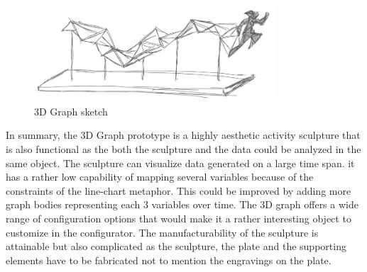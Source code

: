 \documentclass[../medieninformatik-arbeit.tex]{subfiles}
\begin{document}
\begin{figure}[h]
\captionsetup{width=0.8\textwidth}
\begin{center}
  \includegraphics[width=0.8\textwidth]{Prototype/img/3DGraph_detail}
  \caption{3D Graph sketch}
\label{fig:3DgraphDetail}
\end{center}
\end{figure}

In summary, the 3D Graph prototype is a highly aesthetic activity sculpture that is also functional as the both the sculpture and the data could be analyzed in the same object. The sculpture can visualize data generated on a large time span. it has a rather low capability of mapping several variables because of the constraints of the line-chart metaphor. This could be improved by adding more graph bodies representing each 3 variables over time. The 3D graph offers a wide range of configuration options that would make it a rather interesting object to customize in the configurator. The manufacturability of the sculpture is attainable but also complicated as the sculpture, the plate and the supporting elements have to be fabricated not to mention the engravings on the plate. 
\end{document}
